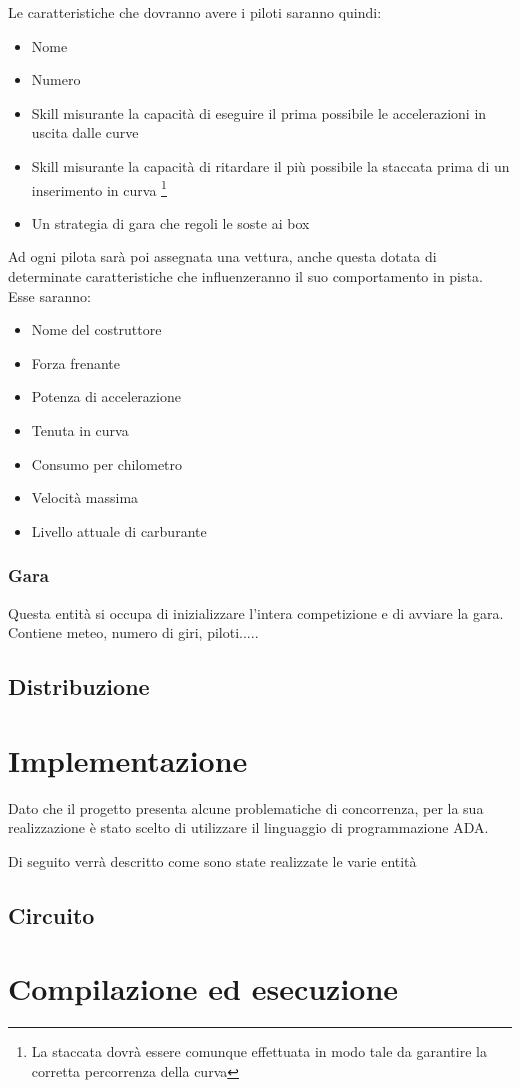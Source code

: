 \documentclass[a4paper,11pt, twoside]{book}
\begin{document}
	Le caratteristiche che dovranno avere i piloti saranno quindi:
	
	\begin{itemize}
	  \item Nome 
	  \item Numero
	  \item Skill misurante la capacità di eseguire il prima possibile le accelerazioni in uscita dalle curve
	  \item Skill misurante la capacità di ritardare il più possibile la staccata prima di un inserimento in curva 
		\footnote{La staccata dovrà essere comunque effettuata in modo tale da garantire la 
		corretta percorrenza della curva}
	  \item Un strategia di gara che regoli le soste ai box
	\end{itemize}
	
	
	Ad ogni pilota sarà poi assegnata una vettura, anche questa dotata di determinate caratteristiche che influenzeranno il suo
	comportamento in pista. Esse saranno:
	
	\begin{itemize}
	  \item Nome del costruttore
	  \item Forza frenante
	  \item Potenza di accelerazione
	  \item Tenuta in curva
	  \item Consumo per chilometro
	  \item Velocità massima
	  \item Livello attuale di carburante
	\end{itemize}

     
	
      \subsection{Gara}
	Questa entità si occupa di inizializzare l'intera competizione e di avviare la gara.
	Contiene meteo, numero di giri, piloti.....
	  
    \section{Distribuzione}
	
  \chapter{Implementazione}
    Dato che il progetto presenta alcune problematiche di concorrenza, per la sua realizzazione è stato scelto
    di utilizzare il linguaggio di programmazione ADA.
    
    Di seguito verrà descritto come sono state realizzate le varie entità
    
    \section{Circuito}
      
  
  \chapter{Compilazione ed esecuzione}
\end{document}
